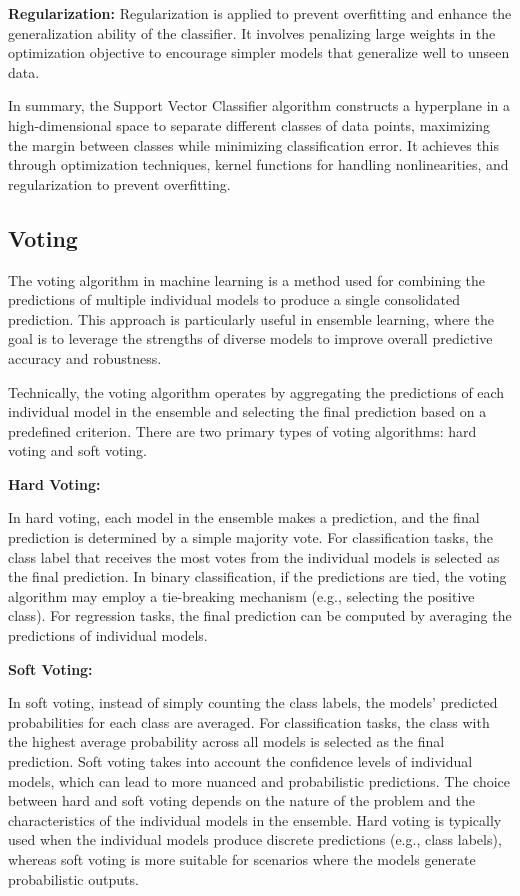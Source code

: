 \documentclass[preprint,aps,nofootinbib,a4paper,superscriptaddress,longbibliography,amsfonts,amssymb,amsmath,titlepage]{revtex4-2}
\begin{document}
\textbf{Regularization:} Regularization is applied to prevent overfitting and enhance the generalization ability of the classifier. It involves penalizing large weights in the optimization objective to encourage simpler models that generalize well to unseen data.

In summary, the Support Vector Classifier algorithm constructs a hyperplane in a high-dimensional space to separate different classes of data points, maximizing the margin between classes while minimizing classification error. It achieves this through optimization techniques, kernel functions for handling nonlinearities, and regularization to prevent overfitting.

\subsection{Voting}

The voting algorithm in machine learning is a method used for combining the predictions of multiple individual models to produce a single consolidated prediction. This approach is particularly useful in ensemble learning, where the goal is to leverage the strengths of diverse models to improve overall predictive accuracy and robustness.

Technically, the voting algorithm operates by aggregating the predictions of each individual model in the ensemble and selecting the final prediction based on a predefined criterion. There are two primary types of voting algorithms: hard voting and soft voting.

\textbf{Hard Voting:}

In hard voting, each model in the ensemble makes a prediction, and the final prediction is determined by a simple majority vote.
For classification tasks, the class label that receives the most votes from the individual models is selected as the final prediction.
In binary classification, if the predictions are tied, the voting algorithm may employ a tie-breaking mechanism (e.g., selecting the positive class).
For regression tasks, the final prediction can be computed by averaging the predictions of individual models.

\textbf{Soft Voting:}

In soft voting, instead of simply counting the class labels, the models' predicted probabilities for each class are averaged.
For classification tasks, the class with the highest average probability across all models is selected as the final prediction.
Soft voting takes into account the confidence levels of individual models, which can lead to more nuanced and probabilistic predictions.
The choice between hard and soft voting depends on the nature of the problem and the characteristics of the individual models in the ensemble. Hard voting is typically used when the individual models produce discrete predictions (e.g., class labels), whereas soft voting is more suitable for scenarios where the models generate probabilistic outputs.
\end{document}
